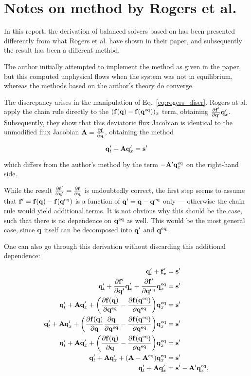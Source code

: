 \chapter{Notes on method by Rogers et al.}
\label{ap:rogers}

In this report, the derivation of balanced solvers based on \citet{rogers2003mathematical} has been presented differently from what Rogers et al. have shown in their paper, and subsequently the result has been a different method.

The author initially attempted to implement the method as given in the paper, but this computed unphysical flows when the system was not in equilibrium, whereas the methods based on the author's theory do converge.

The discrepancy arises in the manipulation of Eq.~\ref{eq:rogers_discr}. Rogers at al. apply the chain rule directly to the $(\vb f(\vb q) - \vb f(\vb q^\mathrm{eq}))_x$ term, obtaining $\pdv{\vb f'}{\vb q'}\vb q'_x$. Subsequently, they show that this deviatoric flux Jacobian is identical to the unmodified flux Jacobian $\vb A = \pdv{\vb f}{\vb q}$, obtaining the method

\begin{equation}
  \vb q'_t + \vb A \vb q'_x = \vb s'
\end{equation}

which differs from the author's method by the term $ - \vb A' \vb q^\mathrm{eq}_x$ on the right-hand side.

While the result $\pdv{\vb f'}{\vb q'} = \pdv{\vb f}{\vb q}$ is undoubtedly correct, the first step seems to assume that $\vb f' = \vb f(\vb q) - \vb f(\vb q^\mathrm{eq})$ is a function of $\vb q' = \vb q - \vb q^\mathrm{eq}$ only --- otherwise the chain rule would yield additional terms. It is not obvious why this should be the case, such that there is no dependence on $\vb q^\mathrm{eq}$ as well. This would be the most general case, since $\vb q$ itself can be decomposed into $\vb q'$ and $\vb q^\mathrm{eq}$.

One can also go through this derivation without discarding this additional dependence:

\begin{align}
  \vb q'_t + \vb f'_x &= \vb s' \\
  \vb q'_t + \pdv{\vb f'}{\vb q'} \vb q'_x + \pdv{\vb f'}{\vb q^\mathrm{eq}} \vb q^\mathrm{eq}_x &= \vb s' \\
  \vb q'_t + \vb A \vb q'_x + \qty(\pdv{\vb f(\vb q)}{\vb q^\mathrm{eq}} - \pdv{\vb f(\vb q^\mathrm{eq})}{\vb q^\mathrm{eq}}) \vb q^\mathrm{eq}_x &= \vb s' \\
  \vb q'_t + \vb A \vb q'_x + \qty(\pdv{\vb f(\vb q)}{\vb q}\pdv{\vb q}{\vb q^\mathrm{eq}} - \pdv{\vb f(\vb q^\mathrm{eq})}{\vb q^\mathrm{eq}}) \vb q^\mathrm{eq}_x &= \vb s' \\
  \vb q'_t + \vb A \vb q'_x + \qty(\pdv{\vb f(\vb q)}{\vb q} - \pdv{\vb f(\vb q^\mathrm{eq})}{\vb q^\mathrm{eq}}) \vb q^\mathrm{eq}_x &= \vb s' \\
  \vb q'_t + \vb A \vb q'_x + \qty(\vb A - \vb A^\mathrm{eq}) \vb q^\mathrm{eq}_x &= \vb s' \\
  \vb q'_t + \vb A \vb q'_x &= \vb s' - \vb A' \vb q^\mathrm{eq}_x,
\end{align}

